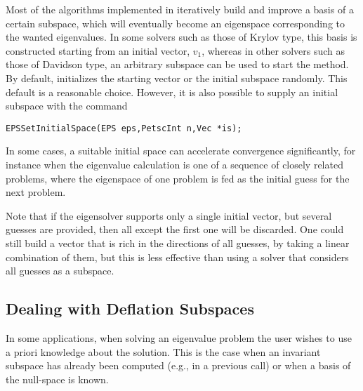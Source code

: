 	Most of the algorithms implemented in  iteratively build and improve a basis of a certain subspace, which will eventually become an eigenspace corresponding to the wanted eigenvalues. In some solvers such as those of Krylov type, this basis is constructed starting from an initial vector, $v_1$, whereas in other solvers such as those of Davidson type, an arbitrary subspace can be used to start the method. By default,  initializes the starting vector or the initial subspace randomly. This default is a reasonable choice. However, it is also possible to supply an initial subspace with the command
	\begin{Verbatim}[fontsize=\small]
	EPSSetInitialSpace(EPS eps,PetscInt n,Vec *is);
	\end{Verbatim}
In some cases, a suitable initial space can accelerate convergence significantly, for instance when the eigenvalue calculation is one of a sequence of closely related problems, where the eigenspace of one problem is fed as the initial guess for the next problem.

Note that if the eigensolver supports only a single initial vector, but several guesses are provided, then all except the first one will be discarded. One could still build a vector that is rich in the directions of all guesses, by taking a linear combination of them, but this is less effective than using a solver that considers all guesses as a subspace.

\subsection{Dealing with Deflation Subspaces}

	In some applications, when solving an eigenvalue problem the user wishes to use a priori knowledge about the solution. This is the case when an invariant subspace has already been computed (e.g., in a previous  call) or when a basis of the null-space is known.

